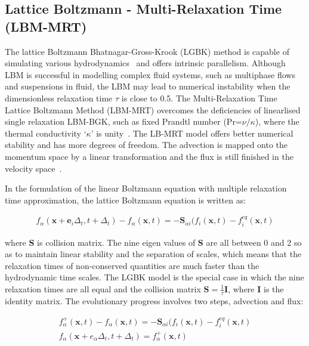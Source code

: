\subsection{Lattice Boltzmann - Multi-Relaxation Time (LBM-MRT)}

The lattice Boltzmann Bhatnagar-Gross-Krook (LGBK) method is capable of 
simulating various hydrodynamics~\citep{Succi1989, Succi2001} and offers 
intrinsic parallelism. Although LBM is successful in modelling complex fluid 
systems, such as multiphase flows and suspensions in fluid, the LBM may lead to 
numerical instability when the dimensionless relaxation time $\tau$ is close to 
0.5. The Multi-Relaxation Time Lattice Boltzmann Method (LBM-MRT) overcomes the 
deficiencies of linearlised single relaxation LBM-BGK, such as fixed Prandtl 
number (Pr=$\nu/\kappa$), where the thermal conductivity `$\kappa$' is 
unity~\citep{Liu2003a}. The LB-MRT model offers better numerical stability and 
has more degrees of freedom. The advection is mapped onto the momentum space by 
a linear transformation and the flux is still finished in the velocity 
space~\citep{Du2006}.

In the formulation of the linear Boltzmann equation with multiple relaxation 
time approximation, the lattice Boltzmann equation is written as:

\begin{align}
f_{\alpha}(\mathbf{x}+\mathbf{e}_i\Delta_t, t+ 
\Delta_t)-f_{\alpha}(\mathbf{x},t)=-\mathbf{S}_{\alpha 
i}(f_i(\mathbf{x},t)-f_i^{eq}(\mathbf{x},t)
\end{align}

\noindent where \textbf{S} is collision matrix. The nine eigen values of 
\textbf{S} are all between 0 and 2 so as to maintain linear stability and the 
separation of scales, which means that the relaxation times of non-conserved 
quantities are much faster than the hydrodynamic time scales. The LGBK model is 
the special case in which the nine relaxation times are all equal and the 
collision matrix $\mathbf{S}=\frac{1}{\tau}\mathbf{I}$, where \textbf{I} is the 
identity matrix. The evolutionary progress involves two steps, advection and 
flux:

\begin{gather}
f_{\alpha}^+(\mathbf{x},t)-f_{\alpha}(\mathbf{x},t) = -\mathbf{S}_{\alpha i}(f_i(\mathbf{x},t)-f_i^{eq}(\mathbf{x},t) \label{eq:advection}\\
f_{\alpha}(\mathbf{x}+e_{\alpha}\Delta_t, t+\Delta_t) = f_{\alpha}^+(\mathbf{x},t)
\end{gather}

